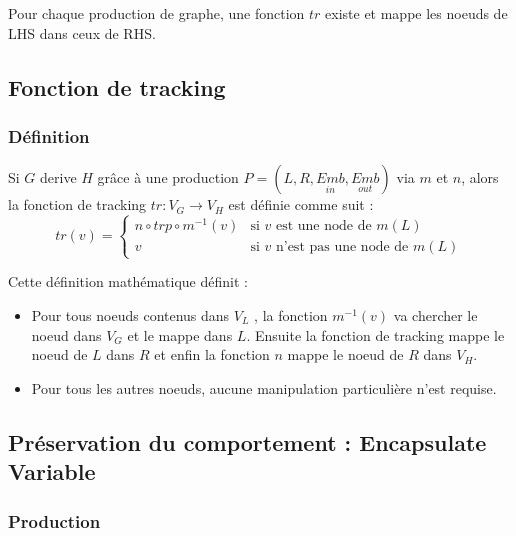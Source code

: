 \documentclass[a4paper, 12pt]{article}
\begin{document}
  Pour chaque production de graphe, une fonction $tr$ existe et mappe les noeuds de LHS dans ceux de RHS.

  \subsection{Fonction de tracking}

  \subsubsection{Définition}
  Si \(G\) derive \(H\) grâce à une production \( P = (L,R,\underset{in}{Emb} ,\underset{out}{Emb} ) \) via $m$ et $n$, alors la fonction de tracking $tr : {V_G} \rightarrow {V_H} $ est définie comme suit :
  \[ tr(v) =
  \begin{cases}
    n \circ trp \circ m^{-1}(v) & \text{si }v\text{ est une node de }m(L)\\
    v & \text{si }v\text{ n'est pas une node de }m(L)
  \end{cases}
  \]

  Cette définition mathématique définit :
  \begin{itemize}[label=\textbullet]
    \item Pour tous noeuds contenus dans \( {V_L} \) , la fonction \(m^{-1}(v)\) va chercher le noeud dans {$V_G$} et le mappe dans \( L \). Ensuite la fonction de tracking mappe le noeud de  \( L \)
    dans  $R$  et enfin la fonction \( n \) mappe le noeud de  \( R \)  dans {$V_H$}.
    \item Pour tous les autres noeuds, aucune manipulation particulière n'est requise.
  \end{itemize}

  \subsection{Préservation du comportement : Encapsulate Variable}

  \subsubsection{Production}
\end{document}
